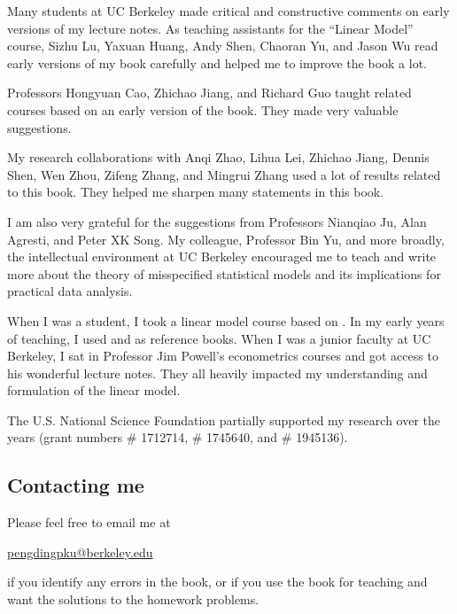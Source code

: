  

Many students at UC Berkeley made critical and constructive comments on early versions of my lecture notes.  As teaching assistants for the ``Linear Model'' course,  
Sizhu Lu,
Yaxuan Huang, 
Andy Shen, 
Chaoran Yu, 
and
Jason Wu read early versions of my book carefully and helped me to improve the book a lot. 


Professors 
Hongyuan Cao, 
Zhichao Jiang, 
and Richard Guo taught related courses based on an early version of the book. They made very valuable suggestions. 


My research collaborations with 
Anqi Zhao, 
Lihua Lei, 
Zhichao Jiang, 
Dennis Shen, 
Wen Zhou, 
Zifeng Zhang,
and Mingrui Zhang used a lot of results related to this book. They helped me sharpen many statements in this book.




I am also very grateful for the suggestions from Professors 
Nianqiao Ju, 
Alan Agresti, 
and Peter XK Song. 
My colleague, Professor Bin Yu,  and more broadly, the intellectual environment at UC Berkeley encouraged me to teach and write more about the theory of misspecified statistical models and its implications for practical data analysis. 




When I was a student, I took a linear model course based on \citet{weisberg2005applied}. 
In my early years of teaching, I used \citet{christensen2002plane} and \citet{agresti2015foundations} as reference books. 
When I was a junior faculty at UC Berkeley, I sat in Professor Jim Powell's econometrics courses and got access to his wonderful lecture notes. They all heavily impacted my understanding and formulation of the linear model. 



The U.S. National Science Foundation partially supported my research over the years (grant numbers \# 1712714, \# 1745640, and \# 1945136). 


\subsection*{Contacting me}

Please feel free to email me at 
\begin{center}
\href{mailto:pengdingpku@berkeley.edu}{pengdingpku@berkeley.edu}
\end{center}
if you identify any errors in the book, or if you use the book for teaching and want the solutions to the homework problems. 

 
